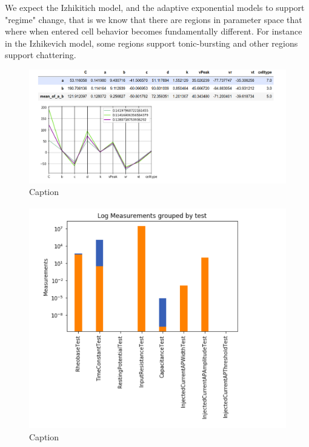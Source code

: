 We expect the Izhikitich model, and the adaptive exponential models to support "regime" change, that is we know that there are regions in parameter space that where when entered cell behavior becomes fundamentally different. For instance in the Izhikevich model, some regions support tonic-bursting and other regions support chattering. 

\begin{figure}
    \centering
    \includegraphics{figures/mean_model_mean_measure_ment_params.png}
    \caption{Caption}
    \label{fig:my_label}
\end{figure}

\begin{figure}
    \centering
    \includegraphics{figures/mean_model_mean_test.png}
    \caption{Caption}
    \label{fig:my_label}
\end{figure}


